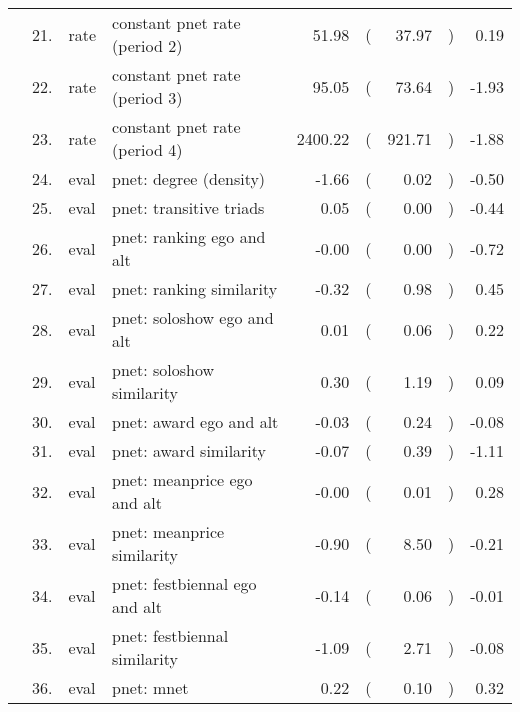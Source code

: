\begin{table}[ht]
\begin{tabular}{llllrlrlr}
    & 21. & rate & constant pnet rate (period 2) & 51.98 & ( & 37.97 & ) & 0.19 \\ 
    & 22. & rate & constant pnet rate (period 3) & 95.05 & ( & 73.64 & ) & -1.93 \\ 
    & 23. & rate & constant pnet rate (period 4) & 2400.22 & ( & 921.71 & ) & -1.88 \\ 
    & 24. & eval & pnet: degree (density) & -1.66 & ( & 0.02 & ) & -0.50 \\ 
    & 25. & eval & pnet: transitive triads & 0.05 & ( & 0.00 & ) & -0.44 \\ 
    & 26. & eval & pnet: ranking ego and alt & -0.00 & ( & 0.00 & ) & -0.72 \\ 
    & 27. & eval & pnet: ranking similarity & -0.32 & ( & 0.98 & ) & 0.45 \\ 
    & 28. & eval & pnet: soloshow ego and alt & 0.01 & ( & 0.06 & ) & 0.22 \\ 
    & 29. & eval & pnet: soloshow similarity & 0.30 & ( & 1.19 & ) & 0.09 \\ 
    & 30. & eval & pnet: award ego and alt & -0.03 & ( & 0.24 & ) & -0.08 \\ 
    & 31. & eval & pnet: award similarity & -0.07 & ( & 0.39 & ) & -1.11 \\ 
    & 32. & eval & pnet: meanprice ego and alt & -0.00 & ( & 0.01 & ) & 0.28 \\ 
    & 33. & eval & pnet: meanprice similarity & -0.90 & ( & 8.50 & ) & -0.21 \\ 
    & 34. & eval & pnet: festbiennal ego and alt & -0.14 & ( & 0.06 & ) & -0.01 \\ 
    & 35. & eval & pnet: festbiennal similarity & -1.09 & ( & 2.71 & ) & -0.08 \\ 
    & 36. & eval & pnet: mnet & 0.22 & ( & 0.10 & ) & 0.32 \\ 
   \hline
\end{tabular}
\end{table}
